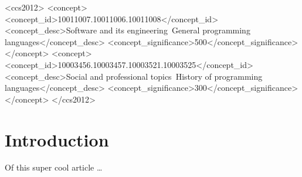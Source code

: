 \documentclass[sigplan,\review anonymous]{acmart}
\begin{document}
\ifx\paperversion\paperversioncamera
\begin{CCSXML}
<ccs2012>
<concept>
<concept_id>10011007.10011006.10011008</concept_id>
<concept_desc>Software and its engineering~General programming languages</concept_desc>
<concept_significance>500</concept_significance>
</concept>
<concept>
<concept_id>10003456.10003457.10003521.10003525</concept_id>
<concept_desc>Social and professional topics~History of programming languages</concept_desc>
<concept_significance>300</concept_significance>
</concept>
</ccs2012>
\end{CCSXML}




\else
{} %
\renewcommand\footnotetextcopyrightpermission[1]{} %
\fi

\maketitle
\ifx\grammarly\grammarlyon 
\onecolumn 
\else 
\fi

\section{Introduction}

Of this super cool article \ldots
{}
\end{document}
